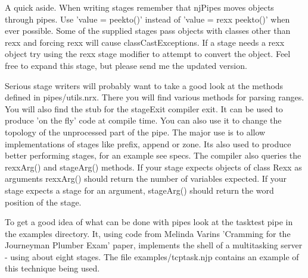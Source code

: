 A quick aside.  When writing stages remember that njPipes moves objects through pipes.  Use 'value = peekto()' instead of 'value = rexx peekto()' when ever possible.  Some of the supplied stages pass objects with classes other than rexx and forcing rexx will cause classCastExceptions. If a stage needs a rexx object try using the rexx stage modifier to attempt to convert the object.  Feel free to expand this stage, but please send me the updated version.

Serious stage writers will probably want to take a good look at the methods defined in pipes/utils.nrx.  There you will find various methods for parsing ranges.  You will also find the stub for the stageExit compiler exit.  It can be used to produce 'on the fly' code at compile time.  You can also use it to change the topology of the unprocessed part of the pipe.  The major use is to allow implementations of stages like prefix, append or zone.  Its also used to produce better performing stages, for an example see specs.
The compiler also queries the rexxArg() and stageArg() methods.  If your stage expects objects of class Rexx as arguments rexxArg() should return the number of variables expected.  If your stage expects a stage for an argument, stageArg() should return the word position of the stage.

To get a good idea of what can be done with pipes look at the tasktest pipe in the examples directory.  It, using code from Melinda Varins 'Cramming for the Journeyman Plumber Exam' paper,  implements the shell of a  multitasking server - using about eight stages.  The file examples/tcptask.njp contains an example of this technique being used.


